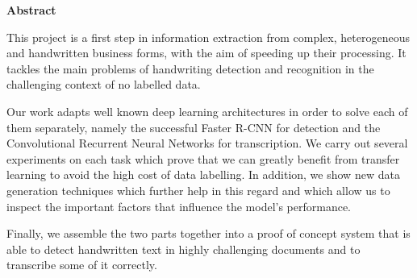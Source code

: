 \thispagestyle{empty}
\vspace*{1cm}

\centerline{\Large\textbf{Abstract}}

\large
	This project is a first step in information extraction from complex, heterogeneous and handwritten business forms, with the aim of speeding up their processing. It tackles the main problems of handwriting detection and recognition in the challenging context of no labelled data.

	Our work adapts well known deep learning architectures in order to solve each of them separately, namely the successful Faster R-CNN for detection and the Convolutional Recurrent Neural Networks for transcription. We carry out several experiments on each task which prove that we can greatly benefit from transfer learning to avoid the high cost of data labelling. In addition, we show new data generation techniques which further help in this regard and which allow us to inspect the important factors that influence the model's performance.

	Finally, we assemble the two parts together into a proof of concept system that is able to detect handwritten text in highly challenging documents and to transcribe some of it correctly.

\normalsize
